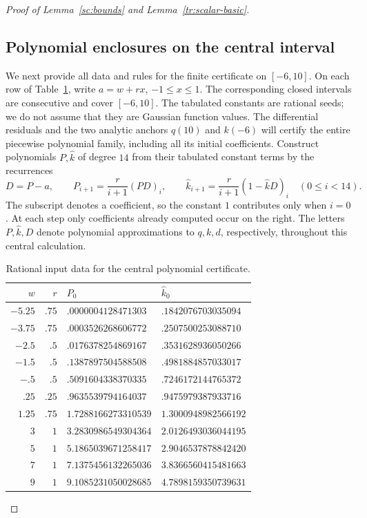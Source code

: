 \documentclass[11pt]{article}
\theoremstyle{definition}
\theoremstyle{remark}
\numberwithin{equation}{section}
\begin{document}
\begin{proof}[Proof of Lemma~\ref{sc:bounds} and Lemma~\ref{tr:scalar-basic}]
\subsection*{Polynomial enclosures on the central interval}
We next provide all data and rules for the finite certificate on $[-6,10]$.
On each row of Table~\ref{cert:centers}, write $a=w+rx$, $-1\le x\le1$.
The corresponding closed intervals are consecutive and cover $[-6,10]$.
The tabulated constants are rational seeds; we do not assume that they are
Gaussian function values. The differential residuals and the two analytic
anchors $q(10)$ and $k(-6)$ will certify the entire piecewise polynomial
family, including all its initial coefficients.
Construct polynomials $P,\widehat k$ of degree $14$ from their tabulated constant
terms by the recurrences
\begin{equation}\label{cert:recurrence}
 D=P-a,\qquad
 P_{i+1}=\frac r{i+1}(PD)_i,\qquad
 \widehat k_{i+1}=\frac r{i+1}(1-\widehat k D)_i\quad(0\le i<14).
\end{equation}
The subscript denotes a coefficient, so the constant $1$ contributes only
when $i=0$. At each step only coefficients already computed occur on the
right. The letters $P,\widehat k,D$ denote polynomial approximations to $q,k,d$,
respectively, throughout this central calculation.

\begin{table}[htbp]

\caption{Rational input data for the central polynomial certificate.}
\label{cert:centers}
\begin{tabular}{r r l l}
\hline
$w$&$r$&$P_0$&$\widehat k_0$\\\hline
$-5.25$&$.75$&$.0000004128471303$&$.1842076703035094$\\
$-3.75$&$.75$&$.0003526268606772$&$.2507500253088710$\\
$-2.5$&$.5$&$.0176378254869167$&$.3531628936050266$\\
$-1.5$&$.5$&$.1387897504588508$&$.4981884857033017$\\
$-.5$&$.5$&$.5091604338370335$&$.7246172144765372$\\
$.25$&$.25$&$.9635539794164037$&$.9475979387933716$\\
$1.25$&$.75$&$1.7288166273310539$&$1.3000948982566192$\\
$3$&$1$&$3.2830986549304364$&$2.0126493036044195$\\
$5$&$1$&$5.1865039671258417$&$2.9046537878842420$\\
$7$&$1$&$7.1375456132265036$&$3.8366560415481663$\\
$9$&$1$&$9.1085231050028685$&$4.7898159350739631$\\\hline
\end{tabular}
\end{table}


\end{proof}
\end{document}
